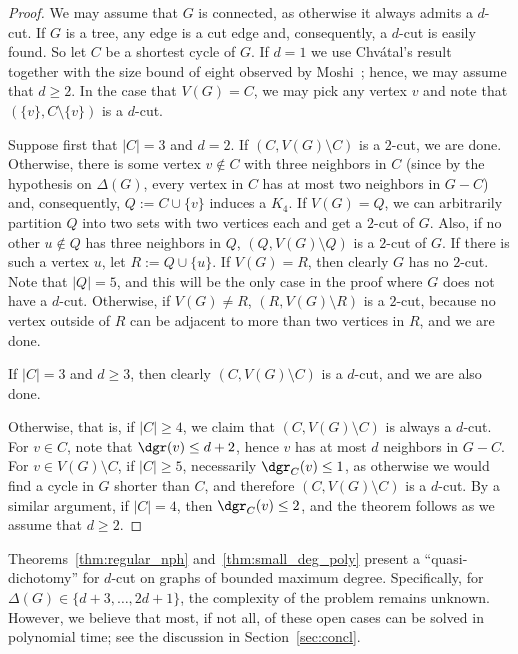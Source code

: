 \documentclass[a4paper,UKenglish,cleveref, autoref]{lipics-v2019}
\newcommand{\ig}[1]{\textcolor{red}{[Ig: #1]}}
\begin{document}
\begin{proof}
    We may assume that $G$ is connected, as otherwise it always admits a $d$-cut. If $G$ is a tree, any edge is a cut edge and, consequently, a $d$-cut is easily found.
    So let $C$ be a shortest cycle of $G$.
    If $d = 1$ we use Chvátal's result~\cite{chvatal_matching_cut} together with the size bound of eight observed by Moshi~\cite{matching_cut_moshi}; hence, we may assume that $d \geq 2$.
    In the case that $V(G) = C$, we may pick any vertex $v$ and note that $(\{v\}, C \setminus \{v\})$ is a $d$-cut.


     Suppose first that $|C| = 3$ and $d = 2$.  If $(C, V(G) \setminus C)$ is a $2$-cut, we are done. Otherwise, there is some vertex $v \notin C$ with three neighbors in $C$ (since by the hypothesis on $\Delta(G)$, every vertex in $C$ has at most two neighbors in $G - C$) and, consequently, $Q := C \cup \{v\}$ induces a $K_4$.
    If $V(G) = Q$, we can arbitrarily partition $Q$ into two sets with two vertices each and get a $2$-cut of $G$.
    Also, if no other $u \notin Q$ has three neighbors in $Q$, $(Q, V(G) \setminus Q)$ is a $2$-cut of $G$.
    If there is such a vertex $u$, let $R := Q \cup \{u\}$. If $V(G) = R$, then clearly $G$ has no $2$-cut. Note that $|Q|=5$, and this will be the only case in the proof where $G$ does not have a $d$-cut. Otherwise, if $V(G) \neq R$, $(R, V(G) \setminus R)$ is a $2$-cut, because no vertex outside of $R$ can be adjacent to more than two vertices in $R$, and we are done.

    If $|C| = 3$ and $d \geq 3$, then clearly $(C, V(G) \setminus C)$ is a $d$-cut, and we are also done.

    Otherwise, that is, if $|C| \geq 4$, we claim that $(C, V(G) \setminus C)$ is always a $d$-cut.
    For $v \in C$, note that $\dgr(v) \leq d + 2$, hence $v$ has at most $d$ neighbors in $G - C$. For $v \in V(G) \setminus C$, if $|C| \geq 5$, necessarily $\dgr_C(v) \leq 1$, as otherwise we would find a cycle in $G$ shorter than $C$, and therefore $(C, V(G) \setminus C)$ is a $d$-cut.
    By a similar argument, if $|C| = 4$, then $\dgr_C(v) \leq 2$, and the theorem follows as we assume that $d \geq 2$.
\end{proof}

Theorems~\ref{thm:regular_nph} and~\ref{thm:small_deg_poly} present a ``quasi-dichotomy'' for $d$-cut on graphs of bounded maximum degree.
Specifically, for $\Delta(G) \in \{d+3, \dots, 2d+1\}$, the complexity of the problem remains unknown.
However, we believe that most, if not all, of these open cases can be solved in polynomial time; see the discussion in Section~\ref{sec:concl}.
\end{document}
